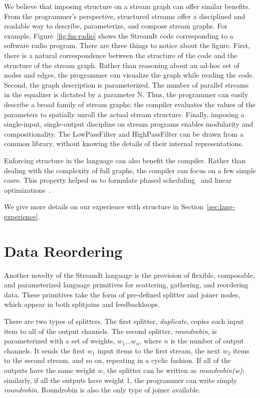 We believe that imposing structure on a stream graph can offer similar
benefits.  From the programmer's perspective, structured streams offer
a disciplined and readable way to describe, parameterize, and compose
stream graphs.  For example, Figure~\ref{fig:fm-radio} shows the
StreamIt code corresponding to a software radio program.  There are
three things to notice about the figure.  First, there is a natural
correspondence between the structure of the code and the structure of
the stream graph.  Rather than reasoning about an ad-hoc set of nodes
and edges, the programmer can visualize the graph while reading the
code.  Second, the graph description is parameterized.  The number of
parallel streams in the equalizer is dictated by a parameter N.  Thus,
the programmer can easily describe a broad family of stream graphs;
the compiler evaluates the values of the parameters to spatially
unroll the actual stream structure.  Finally, imposing a single-input,
single-output discipline on stream programs enables modularity and
compositionality.  The LowPassFilter and HighPassFilter can be drawn
from a common library, without knowing the details of their internal
representations.

Enforcing structure in the language can also benefit the compiler.
Rather than dealing with the complexity of full graphs, the compiler
can focus on a few simple cases.  This property helped us to formulate
phased scheduling~\cite{karczmarek-lctes03,karczma-thesis} and
linear
optimizations~\cite{lamb-pldi03,lamb-thesis,agrawal-cases05,agrawal-thesis}.

We give more details on our experience with structure in Section~\ref{sec:lang-experience}.

\section{Data Reordering}

Another novelty of the StreamIt language is the provision of flexible,
composable, and parameterized language primitives for scattering,
gathering, and reordering data.  These primitives take the form of
pre-defined splitter and joiner nodes, which appear in both splitjoins
and feedbackloops.

There are two types of splitters.  The first splitter, {\it
  duplicate}, copies each input item to all of the output channels.
The second splitter, {\it roundrobin}, is parameterized with a set of
weights, $w_1 \dots w_n$, where $n$ is the number of output channels.
It sends the first $w_1$ input items to the first stream, the next
$w_2$ items to the second stream, and so on, repeating in a cyclic
fashion.  If all of the outputs have the same weight $w$, the splitter
can be written as {\it roundrobin(w)}; similarly, if all the outputs
have weight 1, the programmer can write simply {\it roundrobin}.
Roundrobin is also the only type of joiner available.

